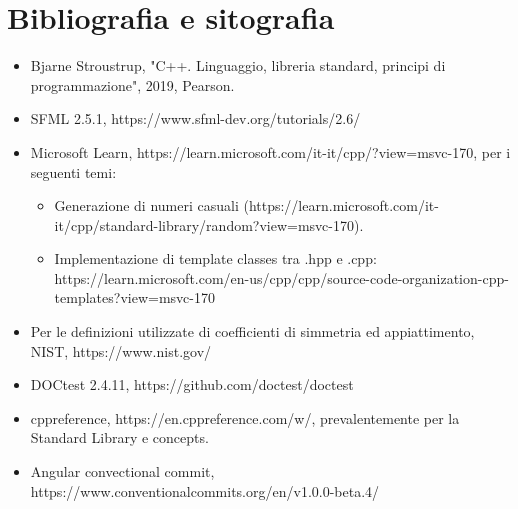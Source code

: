 \documentclass{article}
\begin{document}
\section{Bibliografia e sitografia}

\begin{itemize}
    \item Bjarne Stroustrup, "C++. Linguaggio, libreria standard, principi di programmazione", 2019, Pearson.
    \item SFML 2.5.1, https://www.sfml-dev.org/tutorials/2.6/
    \item Microsoft Learn, https://learn.microsoft.com/it-it/cpp/?view=msvc-170, per i seguenti temi:
    \begin{itemize}
        \item Generazione di numeri casuali (https://learn.microsoft.com/it-it/cpp/standard-library/random?view=msvc-170).
        \item Implementazione di template classes tra .hpp e .cpp:
        https://learn.microsoft.com/en-us/cpp/cpp/source-code-organization-cpp-templates?view=msvc-170
    \end{itemize}
      \item Per le definizioni utilizzate di coefficienti di simmetria ed appiattimento, NIST, https://www.nist.gov/

      \item DOCtest 2.4.11, https://github.com/doctest/doctest
      \item cppreference, https://en.cppreference.com/w/, prevalentemente per la Standard Library e concepts.
      \item Angular convectional commit, https://www.conventionalcommits.org/en/v1.0.0-beta.4/   
\end{itemize}
\end{document}
